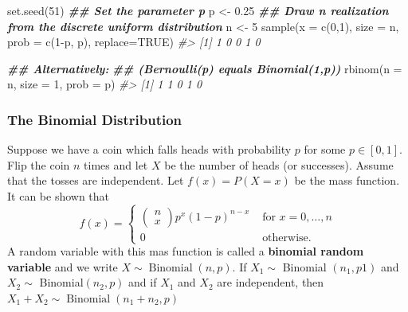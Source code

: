 \documentclass[
  14pt,
]{memoir}
\newenvironment{Shaded}{\begin{snugshade}}{\end{snugshade}}
\newcommand{\AttributeTok}[1]{\textcolor[rgb]{0.77,0.63,0.00}{#1}}
\newcommand{\CommentTok}[1]{\textcolor[rgb]{0.56,0.35,0.01}{\textit{#1}}}
\newcommand{\ConstantTok}[1]{\textcolor[rgb]{0.00,0.00,0.00}{#1}}
\newcommand{\DecValTok}[1]{\textcolor[rgb]{0.00,0.00,0.81}{#1}}
\newcommand{\DocumentationTok}[1]{\textcolor[rgb]{0.56,0.35,0.01}{\textbf{\textit{#1}}}}
\newcommand{\FloatTok}[1]{\textcolor[rgb]{0.00,0.00,0.81}{#1}}
\newcommand{\FunctionTok}[1]{\textcolor[rgb]{0.00,0.00,0.00}{#1}}
\newcommand{\NormalTok}[1]{#1}
\newcommand{\OtherTok}[1]{\textcolor[rgb]{0.56,0.35,0.01}{#1}}
\newcommand{\SpecialCharTok}[1]{\textcolor[rgb]{0.00,0.00,0.00}{#1}}
\begin{document}
\begin{Shaded}
\begin{Highlighting}[]
\FunctionTok{set.seed}\NormalTok{(}\DecValTok{51}\NormalTok{)}
\DocumentationTok{\#\# Set the parameter p}
\NormalTok{p }\OtherTok{\textless{}{-}} \FloatTok{0.25}
\DocumentationTok{\#\# Draw n realization from the discrete uniform distribution}
\NormalTok{n }\OtherTok{\textless{}{-}} \DecValTok{5}
\FunctionTok{sample}\NormalTok{(}\AttributeTok{x =} \FunctionTok{c}\NormalTok{(}\DecValTok{0}\NormalTok{,}\DecValTok{1}\NormalTok{), }\AttributeTok{size =}\NormalTok{ n, }\AttributeTok{prob =} \FunctionTok{c}\NormalTok{(}\DecValTok{1}\SpecialCharTok{{-}}\NormalTok{p, p), }\AttributeTok{replace=}\ConstantTok{TRUE}\NormalTok{)}
\CommentTok{\#\textgreater{} [1] 1 0 0 1 0}

\DocumentationTok{\#\# Alternatively:}
\DocumentationTok{\#\# (Bernoulli(p) equals Binomial(1,p))}
\FunctionTok{rbinom}\NormalTok{(}\AttributeTok{n =}\NormalTok{ n, }\AttributeTok{size =} \DecValTok{1}\NormalTok{, }\AttributeTok{prob =}\NormalTok{ p)}
\CommentTok{\#\textgreater{} [1] 1 1 0 1 0}
\end{Highlighting}
\end{Shaded}

\hypertarget{the-binomial-distribution}{%
\subsubsection{The Binomial Distribution}\label{the-binomial-distribution}}

Suppose we have a coin which falls heads with probability \(p\) for some \(p\in[0,1]\). Flip the coin \(n\) times and let \(X\) be the number of heads (or successes). Assume that the tosses are independent. Let \(f(x)=P(X=x)\) be the mass function. It can be shown that
\[
f(x)=\left\{
\begin{array}{ll}
\left(\begin{array}{l}
n \\
x
\end{array}\right) p^{x}(1-p)^{n-x} & \text { for } x=0, \ldots, n \\
0 & \text { otherwise. }
\end{array}\right.
\]
A random variable with this mas function is called a \textbf{binomial random variable} and we write \(X \sim \operatorname{Binomial}(n, p)\). If \(X_{1} \sim\) Binomial \(\left(n_1, p1\right)\) and \(X_{2} \sim\) Binomial\(\left(n_2, p\right)\) and if \(X_1\) and \(X_2\) are independent, then \(X_{1}+X_{2} \sim \operatorname{Binomial}\left(n_1+n_2, p\right)\)
\end{document}
